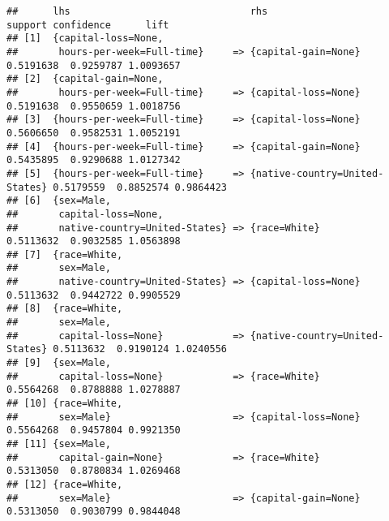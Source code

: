 \documentclass[]{article}
\begin{document}
\begin{verbatim}
##      lhs                               rhs                              support confidence      lift
## [1]  {capital-loss=None,                                                                            
##       hours-per-week=Full-time}     => {capital-gain=None}            0.5191638  0.9259787 1.0093657
## [2]  {capital-gain=None,                                                                            
##       hours-per-week=Full-time}     => {capital-loss=None}            0.5191638  0.9550659 1.0018756
## [3]  {hours-per-week=Full-time}     => {capital-loss=None}            0.5606650  0.9582531 1.0052191
## [4]  {hours-per-week=Full-time}     => {capital-gain=None}            0.5435895  0.9290688 1.0127342
## [5]  {hours-per-week=Full-time}     => {native-country=United-States} 0.5179559  0.8852574 0.9864423
## [6]  {sex=Male,                                                                                     
##       capital-loss=None,                                                                            
##       native-country=United-States} => {race=White}                   0.5113632  0.9032585 1.0563898
## [7]  {race=White,                                                                                   
##       sex=Male,                                                                                     
##       native-country=United-States} => {capital-loss=None}            0.5113632  0.9442722 0.9905529
## [8]  {race=White,                                                                                   
##       sex=Male,                                                                                     
##       capital-loss=None}            => {native-country=United-States} 0.5113632  0.9190124 1.0240556
## [9]  {sex=Male,                                                                                     
##       capital-loss=None}            => {race=White}                   0.5564268  0.8788888 1.0278887
## [10] {race=White,                                                                                   
##       sex=Male}                     => {capital-loss=None}            0.5564268  0.9457804 0.9921350
## [11] {sex=Male,                                                                                     
##       capital-gain=None}            => {race=White}                   0.5313050  0.8780834 1.0269468
## [12] {race=White,                                                                                   
##       sex=Male}                     => {capital-gain=None}            0.5313050  0.9030799 0.9844048

\end{verbatim}
\end{document}

